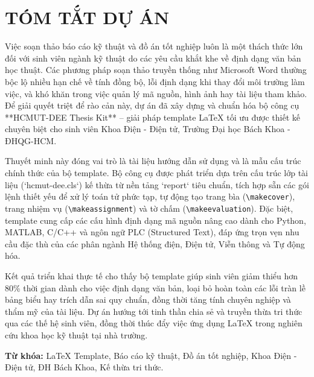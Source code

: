

%

\chapter*{TÓM TẮT DỰ ÁN}

Việc soạn thảo báo cáo kỹ thuật và đồ án tốt nghiệp luôn là một thách thức lớn đối với sinh viên ngành kỹ thuật do các yêu cầu khắt khe về định dạng văn bản học thuật. Các phương pháp soạn thảo truyền thống như Microsoft Word thường bộc lộ nhiều hạn chế về tính đồng bộ, lỗi định dạng khi thay đổi môi trường làm việc, và khó khăn trong việc quản lý mã nguồn, hình ảnh hay tài liệu tham khảo. Để giải quyết triệt để rào cản này, dự án đã xây dựng và chuẩn hóa bộ công cụ **HCMUT-DEE Thesis Kit** – giải pháp template LaTeX tối ưu được thiết kế chuyên biệt cho sinh viên Khoa Điện - Điện tử, Trường Đại học Bách Khoa - ĐHQG-HCM.

Thuyết minh này đóng vai trò là tài liệu hướng dẫn sử dụng và là mẫu cấu trúc chính thức của bộ template. Bộ công cụ được phát triển dựa trên cấu trúc lớp tài liệu (`hcmut-dee.cls`) kế thừa từ nền tảng `report` tiêu chuẩn, tích hợp sẵn các gói lệnh thiết yếu để xử lý toán tử phức tạp, tự động tạo trang bìa (\texttt{\textbackslash makecover}), trang nhiệm vụ (\texttt{\textbackslash makeassignment}) và tờ chấm (\texttt{\textbackslash makeevaluation}). Đặc biệt, template cung cấp các cấu hình định dạng mã nguồn nâng cao dành cho Python, MATLAB, C/C++ và ngôn ngữ PLC (Structured Text), đáp ứng trọn vẹn nhu cầu đặc thù của các phân ngành Hệ thống điện, Điện tử, Viễn thông và Tự động hóa.

Kết quả triển khai thực tế cho thấy bộ template giúp sinh viên giảm thiểu hơn 80\% thời gian dành cho việc định dạng văn bản, loại bỏ hoàn toàn các lỗi tràn lề bảng biểu hay trích dẫn sai quy chuẩn, đồng thời tăng tính chuyên nghiệp và thẩm mỹ của tài liệu. Dự án hướng tới tinh thần chia sẻ và truyền thừa tri thức qua các thế hệ sinh viên, đồng thời thúc đẩy việc ứng dụng LaTeX trong nghiên cứu khoa học kỹ thuật tại nhà trường.

\vspace{0.5cm}
\noindent \textbf{Từ khóa:} LaTeX Template, Báo cáo kỹ thuật, Đồ án tốt nghiệp, Khoa Điện - Điện tử, ĐH Bách Khoa, Kế thừa tri thức.
